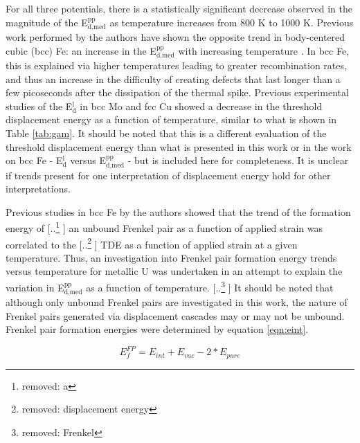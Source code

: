 \documentclass[review]{elsarticle}
\providecommand{\DIFaddtex}[1]{{\protect\color{blue} \sf #1}} %
\providecommand{\DIFdeltex}[1]{{\protect\color{red} [..\footnote{removed: #1} ]}} %
\providecommand{\DIFaddbegin}{} %
\providecommand{\DIFaddend}{} %
\providecommand{\DIFdelbegin}{} %
\providecommand{\DIFdelend}{} %
\providecommand{\DIFadd}[1]{\texorpdfstring{\DIFaddtex{#1}}{#1}} %
\providecommand{\DIFdel}[1]{\texorpdfstring{\DIFdeltex{#1}}{}} %
\newcommand{\DIFscaledelfig}{0.5}
\newlength{\DIFdelgraphicswidth} %
\newlength{\DIFdelgraphicsheight} %
\newcommand{\DIFaddincludegraphics}[2][]{{\color{blue}\fbox{\DIFOincludegraphics[#1]{#2}}}} %
\newcommand{\DIFdelincludegraphics}[2][]{%
\sbox{\DIFdelgraphicsbox}{\DIFOincludegraphics[#1]{#2}}%
\settoboxwidth{\DIFdelgraphicswidth}{\DIFdelgraphicsbox} %
\settoboxtotalheight{\DIFdelgraphicsheight}{\DIFdelgraphicsbox} %
\scalebox{\DIFscaledelfig}{%
\parbox[b]{\DIFdelgraphicswidth}{\usebox{\DIFdelgraphicsbox}\\[-\baselineskip] \rule{\DIFdelgraphicswidth}{0em}}\llap{\resizebox{\DIFdelgraphicswidth}{\DIFdelgraphicsheight}{%
\setlength{\unitlength}{\DIFdelgraphicswidth}%
\begin{picture}(1,1)%
\thicklines\linethickness{2pt} %
{\color[rgb]{1,0,0}\put(0,0){\framebox(1,1){}}}%
{\color[rgb]{1,0,0}\put(0,0){\line( 1,1){1}}}%
{\color[rgb]{1,0,0}\put(0,1){\line(1,-1){1}}}%
\end{picture}%
}\hspace*{3pt}}} %
} %
\DeclareRobustCommand{\DIFaddbegin}{\DIFOaddbegin \let\includegraphics\DIFaddincludegraphics} %
\DeclareRobustCommand{\DIFaddend}{\DIFOaddend \let\includegraphics\DIFOincludegraphics} %
\DeclareRobustCommand{\DIFdelbegin}{\DIFOdelbegin \let\includegraphics\DIFdelincludegraphics} %
\DeclareRobustCommand{\DIFdelend}{\DIFOaddend \let\includegraphics\DIFOincludegraphics} %
\begin{document}
For all three potentials, there is a statistically significant decrease observed in the magnitude of the E$^{\textrm{pp}}_{\textrm{d,med}}$ as temperature increases from 800 K to 1000 K. Previous work performed by the authors have shown the opposite trend in body-centered cubic (bcc) Fe: an increase in the E$^{\textrm{pp}}_{\textrm{d,med}}$ with increasing temperature \cite{beeler2016}. In bcc Fe, this is explained via higher temperatures leading to greater recombination rates, and thus an increase in the difficulty of creating defects that last longer than a few picoseconds after the dissipation of the thermal spike. Previous experimental studies of the E$^{\textrm{l}}_{\textrm{d}}$ in bcc Mo \cite{zag1983} and fcc Cu\cite{yoshida1979} showed a decrease in the \DIFaddbegin \DIFadd{threshold }\DIFaddend displacement energy as a function of temperature, similar to what is shown in Table \ref{tab:gam}. It should be noted that this is a different evaluation of the \DIFaddbegin \DIFadd{threshold }\DIFaddend displacement energy than what is presented in this work or in the work on bcc Fe \cite{beeler2016}- E$^{\textrm{l}}_{\textrm{d}}$ versus E$^{\textrm{pp}}_{\textrm{d,med}}$ - but is included here for completeness. It is unclear if trends present for one interpretation of displacement energy hold for other interpretations. 

Previous studies in bcc Fe \cite{beeler2015, beeler2016} by the authors showed that the trend of the formation energy of \DIFdelbegin \DIFdel{a }\DIFdelend \DIFaddbegin \DIFadd{an unbound }\DIFaddend Frenkel pair as a function of applied strain was correlated to the \DIFdelbegin \DIFdel{displacement energy }\DIFdelend \DIFaddbegin \DIFadd{TDE }\DIFaddend as a function of applied strain at a given temperature. Thus, an investigation into Frenkel pair formation energy trends versus temperature for metallic U was undertaken in an attempt to explain the variation in E$^{\textrm{pp}}_{\textrm{d,med}}$ as a function of temperature. \DIFdelbegin \DIFdel{Frenkel }\DIFdelend \DIFaddbegin \DIFadd{It should be noted that although only unbound Frenkel pairs are investigated in this work, the nature of Frenkel pairs generated via displacement cascades may or may not be unbound. Frenkel }\DIFaddend pair formation energies were determined by equation \ref{eqn:eint}.

\begin{equation}
\label{eqn:eint}
E_{f}^{FP} = E_{int} + E_{vac} - 2*E_{pure}
\end{equation} 
\end{document}
